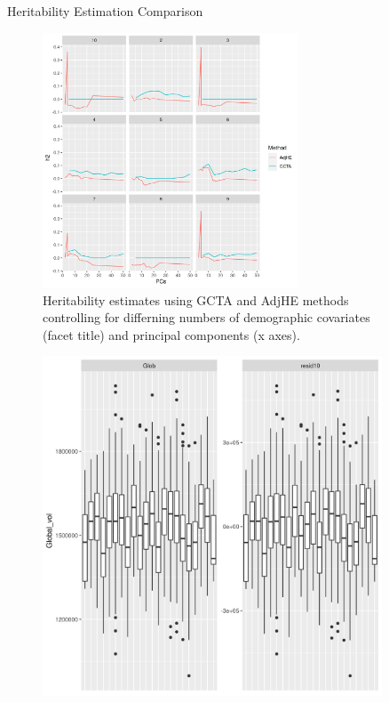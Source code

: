 \documentclass[final]{beamer}
\newlength{\sepwid}
\newlength{\onecolwid}
\newlength{\twocolwid}
\begin{document}
\begin{frame}[t]
\begin{columns}[t]
\begin{column}{\onecolwid}
\end{column} %
\begin{column}{\sepwid}\end{column} %
\begin{column}{\twocolwid} %
\begin{alertblock}{Heritability Estimation  Comparison}
\begin{figure}
\includegraphics[width = 0.75\textwidth]{Graphics/AdjHE_GCTA_PCs.png}
\caption{Heritability estimates using GCTA and AdjHE methods controlling for differning numbers of demographic covariates (facet title) and principal components (x axes).}
\label{fig:power}
\end{figure}
\end{alertblock} 
\begin{figure}
  \begin{minipage}[c]{0.67\textwidth}
    \includegraphics[width=\textwidth, height=0.6\textwidth]{Graphics/global_10pcs.png}

\end{minipage}
\end{figure}
\end{column}
\end{columns}
\end{frame}
\end{document}
